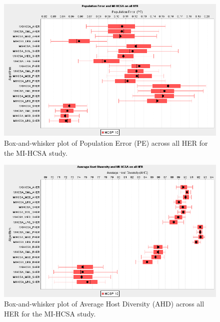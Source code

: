 \begin{figure}[htp]
	\centering
		\includegraphics[scale=0.70]{Hosts/MI-HCSA-PE}
	\caption{Box-and-whisker plot of Population Error (PE) across all HER for the MI-HCSA study.}
	\label{fig:hosts:mihcsa:pe:boxplot}
\end{figure}

\begin{figure}[htp]
	\centering
		\includegraphics[scale=0.70]{Hosts/MI-HCSA-AHD}
	\caption{Box-and-whisker plot of Average Host Diversity (AHD) across all HER for the MI-HCSA study.}
	\label{fig:hosts:mihcsa:ahd:boxplot}
\end{figure}

